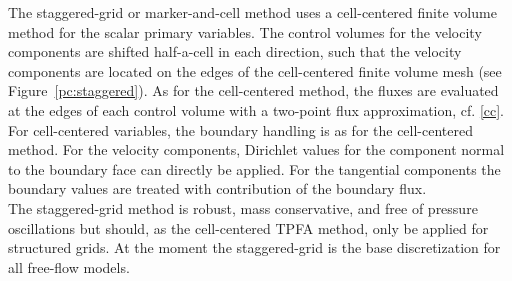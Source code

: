 The staggered-grid or marker-and-cell method uses a cell-centered finite volume method
for the scalar primary variables.
The control volumes for the velocity components are shifted half-a-cell in each direction,
such that the velocity components are located on the edges of the
cell-centered finite volume mesh (see Figure~\ref{pc:staggered}).
As for the cell-centered method, the fluxes are evaluated at the edges
of each control volume with a two-point flux approximation, cf. \ref{cc}.\\
For cell-centered variables, the boundary handling is as for the cell-centered method.
For the velocity components, Dirichlet values for the component normal to the boundary
face can directly be applied.
For the tangential components the boundary values are treated with contribution of the boundary flux. \\
The staggered-grid method is robust, mass conservative, and free of pressure oscillations
but should, as the cell-centered TPFA method, only be applied for structured grids.
At the moment the staggered-grid is the base discretization for all free-flow models.
